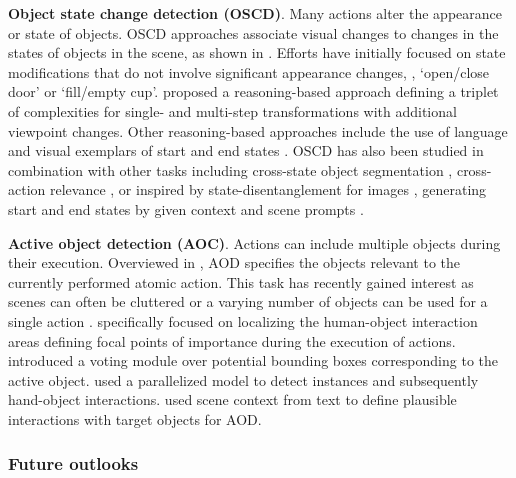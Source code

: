 \noindent
\textbf{Object state change detection (OSCD)}. Many actions alter the appearance or state of objects. OSCD approaches associate visual changes to changes in the states of objects in the scene, as shown in . Efforts \citep{alayrac2017joint,damen2014you,liu2017jointly,zhuo2019explainable} have initially focused on state modifications that do not involve significant appearance changes, \eg, `open/close door' or `fill/empty cup'. \citet{hong2021transformation} proposed a reasoning-based approach defining a triplet of complexities for single- and multi-step transformations with additional viewpoint changes. Other reasoning-based approaches include the use of language \citep{xue2024learning} and visual exemplars of start and end states \citep{souvcek2022look}. OSCD has also been studied in combination with other tasks including cross-state object segmentation \citep{yu2023video}, cross-action relevance \citep{alayrac2024multi}, or inspired by state-disentanglement for images \citep{gouidis2023leveraging,nagarajan2018attributes,saini2022disentangling}, generating start and end states by given context and scene prompts \citep{damen2024genhowto,saini2023chop}.

\noindent
\textbf{Active object detection (AOC)}. Actions can include multiple objects during their execution. Overviewed in , AOD specifies the objects relevant to the currently performed atomic action. This task has recently gained interest as scenes can often be cluttered \citep{ragusa2021meccano} or a varying number of objects can be used for a single action \citep{miech2019howto100m}. \citet{nagarajan2019grounded} specifically focused on localizing the human-object interaction areas defining focal points of importance during the execution of actions. \citep{fu2021sequential} introduced a voting module over potential bounding boxes corresponding to the active object. \citet{kim2021hotr} used a parallelized model to detect instances and subsequently hand-object interactions. \citet{yang2024active} used scene context from text to define plausible interactions with target objects for AOD.  


\subsubsection{Future outlooks}

